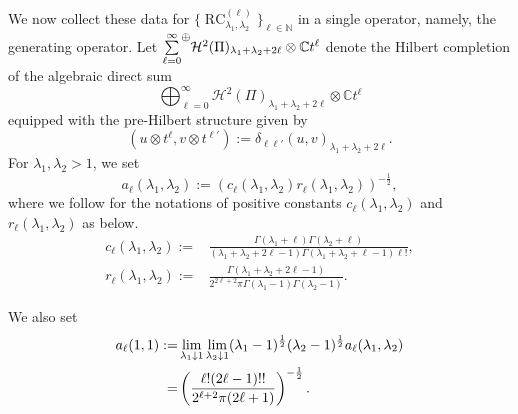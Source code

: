 \documentclass[12pt]{amsart}
\newcommand{\RC}{\operatorname{RC}}
\theoremstyle{plain} %
\theoremstyle{definition} %
\theoremstyle{remark} %
\begin{document}
We now collect these data for $\{\RC_{\lambda_1, \lambda_2}^{(\ell)}\}_{\ell \in {\mathbb{N}}}$
 in a single operator, 
 namely, 
 the generating operator.  
Let ${\underset{\ell=0}{\overset{\infty}\sum}}{\raisebox{.8em}{\text{\footnotesize{$\oplus$}}}} 
{\mathcal{H}}^2(\Pi)_{\lambda_1+\lambda_2+2\ell} \otimes {\mathbb{C}} t^{\ell}$
 denote the Hilbert completion 
 of the algebraic direct sum
\[
   {\bigoplus_{\ell=0}^{\infty}}
   {\mathcal{H}}^2(\Pi)_{\lambda_1+\lambda_2+2\ell}
   \otimes {\mathbb{C}} t^{\ell}
\]
equipped with the pre-Hilbert structure given by
\[
   (u \otimes t^{\ell}, v \otimes t^{\ell'})
   :=
   \delta_{\ell \ell'} (u,v)_{\lambda_1+\lambda_2+2\ell}.  
\]
For $\lambda_1, \lambda_2>1$, 
 we set 
\begin{equation}
\label{eqn:240128}
  a_{\ell}(\lambda_1, \lambda_2):=
 (c_{\ell}(\lambda_1, \lambda_2) r_{\ell}(\lambda_1, \lambda_2))^{-\frac 1 2}, 
\end{equation}
where we follow \cite[(2.8) and (2.9)]{KPinv}
 for the notations of positive constants $c_{\ell}(\lambda_1, \lambda_2)$ and $r_{\ell}(\lambda_1, \lambda_2)$ as below.  
\begin{align*}
  c_{\ell}(\lambda_1, \lambda_2)
  :=&
  \frac{\Gamma(\lambda_1+\ell)\Gamma(\lambda_2+\ell)}
       {(\lambda_1+\lambda_2+2\ell-1)\Gamma(\lambda_1+\lambda_2+\ell-1)\ell!}, 
\\
 r_{\ell}(\lambda_1, \lambda_2)
 :=&
  \frac{\Gamma(\lambda_1+\lambda_2+2\ell-1)}
       {2^{2\ell+2}\pi \Gamma(\lambda_1-1)\Gamma(\lambda_2-1)}.  
\end{align*}

We also set
\begin{align}
\label{eqn:24012811}
a_{\ell}(1,1)
:=&\lim_{\lambda_1 \downarrow 1} 
  \lim_{\lambda_2 \downarrow 1}
  (\lambda_1-1)^{\frac 1 2}  (\lambda_2-1)^{\frac 1 2}
  a_{\ell}(\lambda_1, \lambda_2)
\\
\notag
=&
\left(\frac{\ell !(2\ell-1)!!}
       {2^{\ell+2} \pi(2\ell+1)}
\right)^{-\frac 1 2}.  
\end{align}
\end{document}
